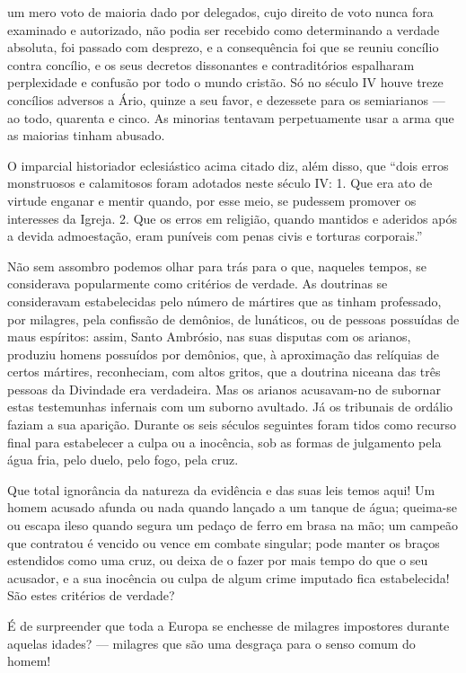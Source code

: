 \documentclass[11pt,a5paper,twoside,openany]{book}
\begin{document}
um mero voto de maioria dado por delegados, cujo direito de voto nunca fora examinado e autorizado, não podia ser recebido como determinando a verdade absoluta, foi passado com desprezo, e a consequência foi que se reuniu concílio contra concílio, e os seus decretos dissonantes e contraditórios espalharam perplexidade e confusão por todo o mundo cristão. Só no século IV houve treze concílios adversos a Ário, quinze a seu favor, e dezessete para os semiarianos — ao todo, quarenta e cinco. As minorias tentavam perpetuamente usar a arma que as maiorias tinham abusado.

O imparcial historiador eclesiástico acima citado diz, além disso, que “dois erros monstruosos e calamitosos foram adotados neste século IV: 1. Que era ato de virtude enganar e mentir quando, por esse meio, se pudessem promover os interesses da Igreja. 2. Que os erros em religião, quando mantidos e aderidos após a devida admoestação, eram puníveis com penas civis e torturas corporais.”

Não sem assombro podemos olhar para trás para o que, naqueles tempos, se considerava popularmente como critérios de verdade. As doutrinas se consideravam estabelecidas pelo número de mártires que as tinham professado, por milagres, pela confissão de demônios, de lunáticos, ou de pessoas possuídas de maus espíritos: assim, Santo Ambrósio, nas suas disputas com os arianos, produziu homens possuídos por demônios, que, à aproximação das relíquias de certos mártires, reconheciam, com altos gritos, que a doutrina niceana das três pessoas da Divindade era verdadeira. Mas os arianos acusavam-no de subornar estas testemunhas infernais com um suborno avultado. Já os tribunais de ordálio faziam a sua aparição. Durante os seis séculos seguintes foram tidos como recurso final para estabelecer a culpa ou a inocência, sob as formas de julgamento pela água fria, pelo duelo, pelo fogo, pela cruz.

Que total ignorância da natureza da evidência e das suas leis temos aqui! Um homem acusado afunda ou nada quando lançado a um tanque de água; queima-se ou escapa ileso quando segura um pedaço de ferro em brasa na mão; um campeão que contratou é vencido ou vence em combate singular; pode manter os braços estendidos como uma cruz, ou deixa de o fazer por mais tempo do que o seu acusador, e a sua inocência ou culpa de algum crime imputado fica estabelecida! São estes critérios de verdade?

É de surpreender que toda a Europa se enchesse de milagres impostores durante aquelas idades? — milagres que são uma desgraça para o senso comum do homem!
\end{document}

